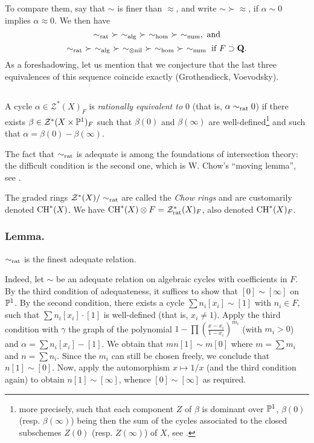 \documentclass[../main.tex]{subfiles}
\begin{document}
To compare them, say that $\sim$ is finer than $\approx$, and write $\sim \succ \approx$, if $\alpha \sim 0$ implies $\alpha \approx 0$. We then have
$$\sim_{\rat}\ \succ\ \sim_{\alg}\ \succ\ \sim_{\hom}\ \succ\ \sim_{\num},\text{ and}$$
$$\sim_{\rat}\ \succ\ \sim_{\alg}\ \succ\ \sim_{\otimes\nil}\ \succ\ \sim_{\hom}\ \succ\ \sim_{\num}\text{ if } F \supset \Q.$$
As a foreshadowing, let us mention that we conjecture that the last three equivalences of this sequence coincide exactly (Grothendieck, Voevodsky).

\subsection{} A cycle $\alpha \in \mathcal{Z}^*(X)_F$ is \emph{rationally equivalent to $0$} (that is, $\alpha \sim_{\rat} 0$) if there exists $\beta \in \mathcal{Z}^*(X \times \P^1)_F$ such that $\beta(0)$ and $\beta(\infty)$ are well-defined\footnote{more precisely, such that each component $Z$ of $\beta$ is dominant over $\P^1$, $\beta(0)$ (resp. $\beta(\infty)$) being then the sum of the cycles associated to the closed subschemes $Z(0)$ (resp. $Z(\infty)$) of $X$, see \cite{fu84}.} and such that $\alpha = \beta(0) - \beta(\infty)$.

The fact that $\sim_{\rat}$ is adequate is among the foundations of intersection theory: the difficult condition is the second one, which is W. Chow's \enquote{moving lemma}, see \cite{fu84}.

The graded rings $\mathcal{Z}^*(X)/\sim_{\rat}$ are called the \emph{Chow rings} and are customarily denoted $\CH^*(X)$.
We have $\CH^*(X) \otimes F = \mathcal{Z}^*_{\rat}(X)_F$, also denoted $\CH^*(X)_F$.

\subsubsection{Lemma.} $\sim_{\rat}$ is the finest adequate relation.

Indeed, let $\sim$ be an adequate relation on algebraic cycles with coefficients in $F$.
By the third condition of adequateness, it suffices to show that $[0] \sim [\infty]$ on $\P^1$.
By the second condition, there exists a cycle $\sum n_i[x_i] \sim [1]$ with $n_i \in F$, such that $\sum n_i[x_i] \cdot [1]$ is well-defined (that is, $x_i \neq 1$).
Apply the third condition with $\gamma$ the graph of the polynomial $1 - \prod \left(\frac{x - x_i}{1 - x_i}\right)^{m_i}$ (with $m_i > 0$) and $\alpha = \sum n_i[x_i] - [1]$.
We obtain that $mn[1] \sim m[0]$ where $m = \sum m_i$ and $n = \sum n_i$.
Since the $m_i$ can still be chosen freely, we conclude that $n[1] \sim [0]$.
Now, apply the automorphism $x \mapsto 1/x$ (and the third condition again) to obtain $n[1] \sim [\infty]$, whence $[0] \sim [\infty]$ as required.
\end{document}
